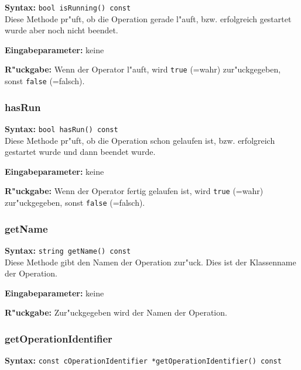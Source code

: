 \textbf{Syntax:} \verb|bool isRunning() const| \\

Diese Methode pr"uft, ob die Operation gerade l"auft, bzw. erfolgreich gestartet wurde aber noch nicht beendet.

\bigskip\noindent
\textbf{Eingabeparameter:} keine

\bigskip\noindent
\textbf{R"uckgabe:} Wenn der Operator l"auft, wird \verb|true| (=wahr) zur"uckgegeben, sonst \verb|false| (=falsch).


\subsubsection{hasRun}

\textbf{Syntax:} \verb|bool hasRun() const| \\

Diese Methode pr"uft, ob die Operation schon gelaufen ist, bzw. erfolgreich gestartet wurde und dann beendet wurde.

\bigskip\noindent
\textbf{Eingabeparameter:} keine

\bigskip\noindent
\textbf{R"uckgabe:} Wenn der Operator fertig gelaufen ist, wird \verb|true| (=wahr) zur"uckgegeben, sonst \verb|false| (=falsch).


\subsubsection{getName}

\textbf{Syntax:} \verb|string getName() const| \\

Diese Methode gibt den Namen der Operation zur"uck. Dies ist der Klassenname der Operation.

\bigskip\noindent
\textbf{Eingabeparameter:} keine

\bigskip\noindent
\textbf{R"uckgabe:} Zur"uckgegeben wird der Namen der Operation.


\subsubsection{getOperationIdentifier}

\textbf{Syntax:} \verb|const cOperationIdentifier *getOperationIdentifier() const| \\

